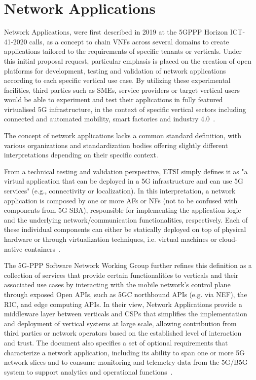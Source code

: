 \section{Network Applications} \label{sota:networkapplications}

Network Applications, were first described in 2019 at the 5GPPP Horizon ICT-41-2020 calls, as a concept to chain \acp{VNF} across several domains to create applications tailored to the requirements of specific tenants or verticals. Under this initial proposal request, particular emphasis is placed on the creation of open platforms for development, testing and validation of network applications according to each specific vertical use case. By utilizing these experimental facilities, third parties such as \acsp{SME}, service providers or target vertical users would be able to experiment and test their applications in fully featured virtualised \acs{5G} infrastructure, in the context of specific vertical sectors including connected and automated mobility, smart factories and industry 4.0~\cite{ICT-41-2020}.

The concept of network applications lacks a common standard definition, with various organizations and standardization bodies offering slightly different interpretations depending on their specific context.

From a technical testing and validation perspective, \acs{ETSI} simply defines it as "a virtual application that can be deployed in a 5G infrastructure and can use 5G services" (e.g., connectivity or localization). In this interpretation, a network application is composed by one or more \acp{AF} or \acp{NF} (not to be confused with components from \ac{5G} \ac{SBA}), responsible for implementing the application logic and the underlying network/communication functionalities, respectively. Each of these individual components can either be statically deployed on top of physical hardware or through virtualization techniques, i.e. virtual machines or cloud-native containers~\cite{ETSI_TS_104_074_V1_1_1}.

The 5G-PPP Software Network Working Group further refines this definition as a collection of services that provide certain functionalities to verticals and their associated use cases by interacting with the mobile network's control plane through exposed Open \acsp{API}, such as \acs{5GC} northbound \acsp{API} (e.g. via \acs{NEF}), the \acs{RIC}, and edge computing \acsp{API}. In their view, Network Applications provide a middleware layer between verticals and \acsp{CSP} that simplifies the implementation and deployment of vertical systems at large scale, allowing contribution from third parties or network operators based on the established level of interaction and trust. The document also specifies a set of optional requirements that characterize a network application, including its ability to span one or more \acs{5G} network slices and to consume monitoring and telemetry data from the \acs{5G}/\acs{B5G} system to support analytics and operational functions~\cite{NetworkApps5GPPP}.

